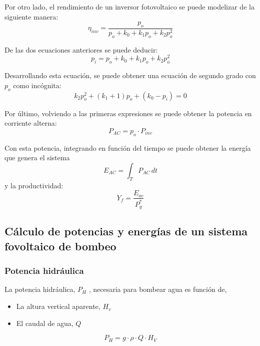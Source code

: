Por otro lado, el rendimiento de un inversor fotovoltaico se puede modelizar de la siguiente manera:
\begin{equation}
\eta_{inv}=\frac{p_o}{p_o+k_0+k_1p_o+k_2p_o^2}
\end{equation}

De las dos ecuaciones anteriores se puede deducir:
\begin{equation}
p_i=p_o+k_0+k_1p_o+k_2p_o^2
\end{equation}

Desarrollando esta ecuación, se puede obtener una ecuación de segundo grado con \(p_o\) como incógnita:
\begin{equation}
k_2p_o^2+(k_1+1)p_o+(k_0-p_i)=0
\end{equation}

Por último, volviendo a las primeras expresiones se puede obtener la potencia en corriente alterna:
\begin{equation}
P_{AC}=p_o\cdot P_{inv}
\end{equation}

Con esta potencia, integrando en función del tiempo se puede obtener la energía que genera el sistema
\begin{equation}
E_{AC}=\int_{T} P_{AC} \,dt
\end{equation}
y la productividad:
\begin{equation}
Y_f=\frac{E_{ac}}{P_g^*}
\end{equation}

\subsection{Cálculo de potencias y energías de un sistema fovoltaico de bombeo}
\label{sec:org412521a}
\subsubsection{Potencia hidráulica}
\label{sec:org23bc251}
La potencia hidráulica, \(P_H\) , necesaria para bombear agua es función de,
\begin{itemize}
\item La altura vertical aparente, \(H_v\) 
\item El caudal de agua, \(Q\)   
\end{itemize}
\begin{equation}
P_H=g\cdot \rho \cdot Q \cdot H_V
\end{equation}

